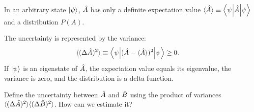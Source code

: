 In an arbitrary state $\left|\psi\right\rangle$, $\hat{A}$ has only a definite expectation value $\langle\hat{A}\rangle\equiv\left\langle\psi\middle|\hat{A}\middle|\psi\right\rangle$ and a distribution $P(A)$.
\begin{center}\end{center}
The uncertainty is represented by the variance:
\begin{equation}
\langle(\Delta\hat{A})^2\rangle\equiv
\left\langle\psi\middle|(\hat{A}-\langle\hat{A}\rangle)^2\middle|\psi\right\rangle\ge0.
\end{equation}
If $\left|\psi\right\rangle$ is an eigenstate of $\hat{A}$, the expectation value equals its eigenvalue, the variance is zero, and the distribution is a delta function.
\begin{center}\end{center}
Define the uncertainty between $\hat{A}$ and $\hat{B}$ using the product of variances $\langle(\Delta\hat{A})^2\rangle\langle(\Delta\hat{B})^2\rangle$. How can we estimate it?

